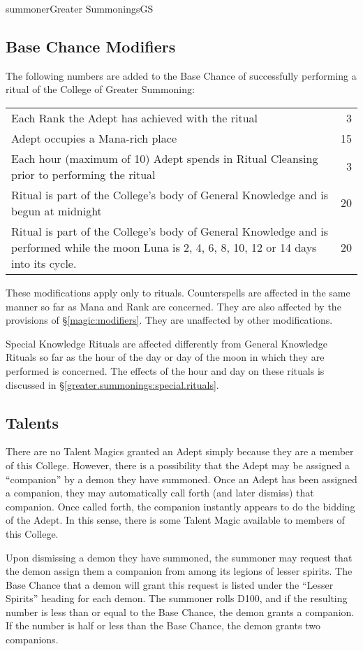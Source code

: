 \begin{college}[1.0]{summoner}{Greater Summonings}{GS}
\subsection{Base Chance Modifiers}

The following numbers are added to the Base Chance of successfully
performing a ritual of the College of Greater Summoning:

\begin{tabularx}{\linewidth}{Xr}
Each Rank the Adept has achieved with the ritual & 3 \\
Adept occupies a Mana-rich place & 15 \\
Each hour (maximum of 10) Adept spends in Ritual Cleansing prior to
performing the ritual & 3 \\
Ritual is part of the College's body of General Knowledge and is begun
at midnight & 20 \\
Ritual is part of the College's body of General Knowledge and is
performed while the moon Luna is 2, 4, 6, 8, 10, 12 or 14 days into its
cycle. & 20 \\
\end{tabularx}

These modifications apply only to rituals.  Counterspells are affected
in the same manner so far as Mana and Rank are concerned.  They are
also affected by the provisions of \S\ref{magic:modifiers}.  They are
unaffected by other modifications.

Special Knowledge Rituals are affected differently from General
Knowledge Rituals so far as the hour of the day or day of the moon in
which they are performed is concerned.  The effects of the hour and
day on these rituals is discussed in
\S\ref{greater.summonings:special.rituals}.

\subsection{Talents}

There are no Talent Magics granted an Adept simply because they are a
member of this College.  However, there is a possibility that the
Adept may be assigned a ``companion'' by a demon they have summoned.
Once an Adept has been assigned a companion, they may automatically
call forth (and later dismiss) that companion.  Once called forth, the
companion instantly appears to do the bidding of the Adept.  In this
sense, there is some Talent Magic available to members of this
College.

Upon dismissing a demon they have summoned, the summoner may request
that the demon assign them a companion from among its legions of
lesser spirits.  The Base Chance that a demon will grant this request
is listed under the ``Lesser Spirits'' heading for each demon.  The
summoner rolls D100, and if the resulting number is less than or equal
to the Base Chance, the demon grants a companion.  If the number is
half or less than the Base Chance, the demon grants two companions.


\end{college}
